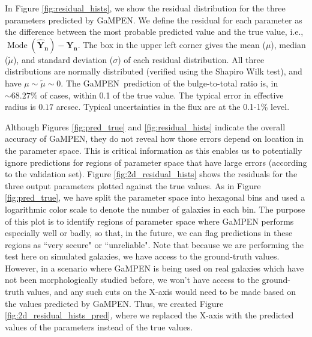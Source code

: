 \documentclass[twocolumn]{aastex63}
\newcommand\gampen{GaMPEN}
\begin{document}
\begin{CJK*}{UTF8}{gbsn}
In Figure \ref{fig:residual_hists}, we show the residual distribution for the three parameters predicted by \gampen{}. We define the residual for each parameter as the difference between the most probable predicted value and the true value, i.e., $\operatorname{Mode}(\boldsymbol{\hat{Y}_n}) - \boldsymbol{Y_n}$. The box in the upper left corner gives 
the mean ($\mu$), median ($\tilde{\mu}$), and standard deviation ($\sigma$) of each residual distribution. 
All three distributions are normally distributed (verified using the Shapiro Wilk test), and have $\mu \sim \tilde{\mu} \sim 0$.
The \gampen\ prediction of the bulge-to-total ratio is, in $\sim68.27\%$ of cases, within 0.1 of the true value.
The typical error in effective radius is $0.17$ arcsec.
Typical uncertainties in the flux are at the 0.1-1\% level.

Although Figures \ref{fig:pred_true} and \ref{fig:residual_hists} indicate the overall accuracy of \gampen{}, they do not reveal how those errors depend on location in the parameter space. This is critical information as this enables us to potentially ignore predictions for regions of parameter space that have large errors (according to the validation set).
Figure \ref{fig:2d_residual_hists} shows the residuals for the three output parameters plotted against the true values. As in Figure \ref{fig:pred_true}, we have split the parameter space into hexagonal bins and used a logarithmic color scale to denote the number of galaxies in each bin. The purpose of this plot is to identify regions of parameter space where \gampen{} performs especially well or badly, so that, in the future, we can flag predictions in these regions as ``very secure" or ``unreliable". Note that because we are performing the test here on simulated galaxies, we have access to the ground-truth values. However, in a scenario where \gampen{} is being used on real galaxies which have not been morphologically studied before, we won't have access to the ground-truth values, and any such cuts on the X-axis would need to be made based on the values predicted by \gampen{}. Thus, we created Figure \ref{fig:2d_residual_hists_pred}, where we replaced the X-axis with the predicted values of the parameters instead of the true values. 


\end{CJK*}
\end{document}
